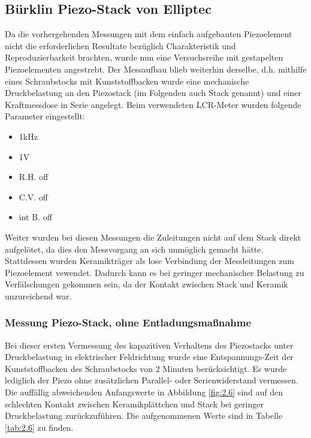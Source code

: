 \documentclass[12pt]{scrreprt} %
\begin{document}
\subsection{Bürklin Piezo-Stack von Elliptec}
Da die vorhergehenden Messungen mit dem einfach aufgebauten Piezoelement nicht die erforderlichen Resultate bezüglich Charakteristik und Reproduzierbarkeit brachten, wurde nun eine Versuchsreihe mit gestapelten Piezoelementen angestrebt. Der Messaufbau blieb weiterhin derselbe, d.h. mithilfe eines Schraubstocks mit Kunststoffbacken wurde eine mechanische Druckbelastung an den Piezostack (im Folgenden auch Stack genannt) und einer Kraftmessdose in Serie angelegt. Beim verwendeten LCR-Meter wurden folgende Parameter eingestellt:
\begin{itemize}
\item 1kHz
\item 1V
\item R.H. off
\item C.V. off
\item int B. off
\end{itemize}
Weiter wurden bei diesen Messungen die Zuleitungen nicht auf dem Stack direkt aufgelötet, da dies den Messvorgang an sich unmöglich gemacht hätte. Stattdessen wurden Keramikträger als lose Verbindung der Messleitungen zum Piezoelement vewendet. Dadurch kann es bei geringer mechanischer Belastung zu Verfälschungen gekommen sein, da der Kontakt zwischen Stack und Keramik unzureichend war.
\subsubsection{Messung Piezo-Stack, ohne Entladungsmaßnahme}
Bei dieser ersten Vermessung des kapazitiven Verhaltens des Piezostacks unter Druckbelastung in elektrischer Feldrichtung wurde eine Entspannungs-Zeit der Kunststoffbacken des Schraubstocks von 2 Minuten berücksichtigt. Es wurde lediglich der Piezo ohne zusätzlichen Parallel- oder Serienwiderstand vermessen. Die auffällig abweichenden Anfangswerte in Abbildung \vref{fig:2.6} sind auf den schlechten Kontakt zwischen Keramikplättchen und Stack bei geringer Druckbelastung zurückzuführen. Die aufgenommenen Werte sind in Tabelle \vref{tab:2.6} zu finden.
\end{document}
